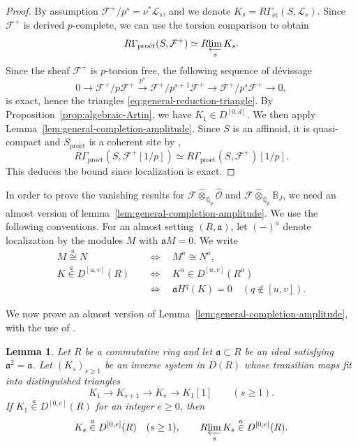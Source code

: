 \documentclass[11pt]{article}
\newtheorem{lemma}[theorem]{Lemma}
\theoremstyle{definition}
\newcommand{\cF}{\mathcal F}
\newcommand{\cL}{\mathcal L}
\newcommand{\proet}{\mathrm{pro\acute et}}
\newcommand{\et}{\mathrm{\acute et}}
\newcommand{\acong}{\mathrel{\overset{a}{\cong}}}
\newcommand{\ain}{\mathrel{\overset{a}{\in}}}
\begin{document}
\begin{proof}
By assumption $\cF^+/p^s=\nu^*\cL_s$, and we denote \(K_s=R\Gamma_{\et}(S,\mathcal L_s)\).
Since $\cF^+$ is derived $p$-complete, we can use the torsion comparison
\cite[Corollary~3.17]{ScholzeRigid} to obtain 
\[
 R\Gamma_{\proet}(S,\mathcal F^+)
 \simeq R\!\varprojlim_s K_s.
\]
Since the sheaf \(\mathcal F^+\) is $p$-torsion free, the following sequence of d\'evissage 
\begin{equation}\label{eq:general-lattice-successive-reduction}
 0\longrightarrow\mathcal F^+/p\mathcal F^+
 \xrightarrow{p^s}\mathcal F^+/p^{s+1}\mathcal F^+
 \longrightarrow\mathcal F^+/p^s\mathcal F^+
 \longrightarrow0,
\end{equation}
is exact, hence the triangles \eqref{eq:general-reduction-triangle}.
By Proposition~\ref{prop:algebraic-Artin}, we have
\(K_1\in D^{[0,d]}\). We then apply
Lemma~\ref{lem:general-completion-amplitude}.
Since $S$ is an affinoid, it is quasi-compact and 
$S_{\proet}$ is a coherent site by \cite[Proposition~3.12]{ScholzeRigid},
\begin{equation}\label{eq:general-local-rationalization}
 R\Gamma_{\proet}(S,\mathcal F^+[1/p])
 \simeq R\Gamma_{\proet}(S,\mathcal F^+)[1/p].
\end{equation}
This deduces the bound since localization is exact.
\end{proof}

In order to prove the vanishing results for $\mathcal{F}\widehat{\otimes}_{\mathbb{Q}_p}\widehat{\mathscr{O}}$
and $\cF\widehat{\otimes}_{\mathbb{Q}_p}\mathbb{B}_J$, we need an almost version of lemma~\ref{lem:general-completion-amplitude}. 
We use the following conventions. For an almost setting \((R,\mathfrak a)\), let \((-)^a\) denote
localization by the modules \(M\) with \(\mathfrak aM=0\).  We write
\[
 \begin{aligned}
 M\acong N&\quad\Longleftrightarrow\quad M^a\cong N^a,\\
 K\ain D^{[u,v]}(R)
 &\quad\Longleftrightarrow\quad K^a\in D^{[u,v]}(R^a)\\
 &\quad\Longleftrightarrow\quad
 \mathfrak aH^q(K)=0\quad(q\notin[u,v]).
 \end{aligned}
\]

We now prove an almost version of
Lemma~\ref{lem:general-completion-amplitude}, with the use of
\cite[Lemma~2.4.2(ii)--(iii)]{GabberRamero}.

\begin{lemma}
\label{lem:general-almost-completion-amplitude}
Let \(R\) be a commutative ring and let
\(\mathfrak a\subset R\) be an ideal satisfying
\(\mathfrak a^2=\mathfrak a\).
Let \((K_s)_{s\geq1}\) be an inverse system in \(D(R)\)
whose transition maps fit into distinguished triangles
\[
 K_1\longrightarrow K_{s+1}\longrightarrow K_s
 \longrightarrow K_1[1]\qquad(s\geq1).
\]
If \(K_1\ain D^{[0,e]}(R)\) for an integer \(e\geq0\), then
\[
 K_s\ain D^{[0,e]}(R)\quad(s\geq1),\qquad
 R\!\varprojlim_s K_s\ain D^{[0,e]}(R).
\]
\end{lemma}
\end{document}
